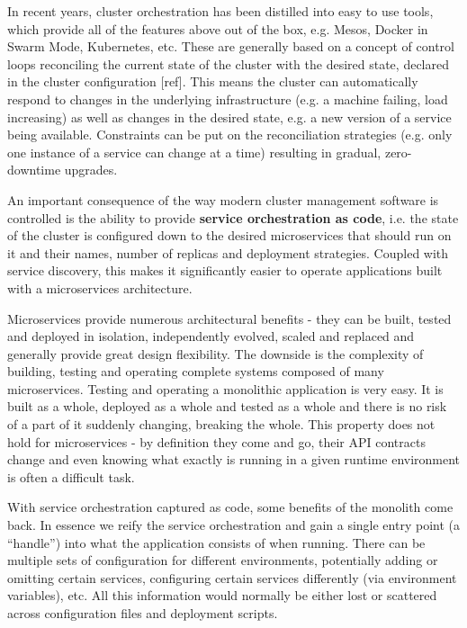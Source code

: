 \documentclass[reprint,amsmath,amssymb,aps]{revtex4-1}
\begin{document}
In recent years, cluster orchestration has been distilled into easy to use tools, which provide all of the features above out of the box, e.g. Mesos, Docker in Swarm Mode, Kubernetes, etc. These are generally based on a concept of control loops reconciling the current state of the cluster with the desired state, declared in the cluster configuration [ref]. This means the cluster can automatically respond to changes in the underlying infrastructure (e.g. a machine failing, load increasing) as well as changes in the desired state, e.g. a new version of a service being available. Constraints can be put on the reconciliation strategies (e.g. only one instance of a service can change at a time) resulting in gradual, zero-downtime upgrades.

An important consequence of the way modern cluster management software is controlled is the ability to provide \textbf{service orchestration as code}, i.e. the state of the cluster is configured down to the desired microservices that should run on it and their names, number of replicas and deployment strategies. Coupled with service discovery, this makes it significantly easier to operate applications built with a microservices architecture.

Microservices provide numerous architectural benefits - they can be built, tested and deployed in isolation, independently evolved, scaled and replaced and generally provide great design flexibility. The downside is the complexity of building, testing and operating complete systems composed of many microservices. Testing and operating a monolithic application is very easy. It is built as a whole, deployed as a whole and tested as a whole and there is no risk of a part of it suddenly changing, breaking the whole. This property does not hold for microservices - by definition they come and go, their API contracts change and even knowing what exactly is running in a given runtime environment is often a difficult task.

With service orchestration captured as code, some benefits of the monolith come back. In essence we reify the service orchestration and gain a single entry point (a “handle”) into what the application consists of when running. There can be multiple sets of configuration for different environments, potentially adding or omitting certain services, configuring certain services differently (via environment variables), etc. All this information would normally be either lost or scattered across configuration files and deployment scripts.
\end{document}
